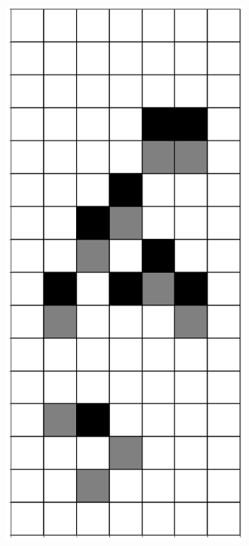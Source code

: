 \documentclass[12pt]{article}
\numberwithin{figure}{section} %
\begin{document}
\begin{figure}[H]
\begin{subfigure}{0.19\textwidth}
     \subcaption{}
   \end{subfigure}
        \begin{subfigure}{0.19\textwidth}
     \centering
     \includegraphics[width=\linewidth]{Section4/19.2}

\end{subfigure}
\end{figure}
\end{document}
